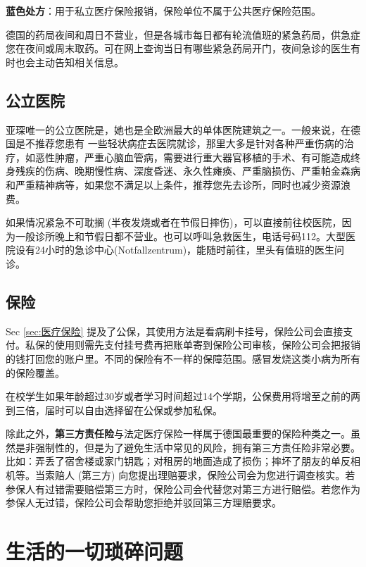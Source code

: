     \textbf{蓝色处方}：用于私立医疗保险报销，保险单位不属于公共医疗保险范围。

    德国的药局夜间和周日不营业，但是各城市每日都有轮流值班的紧急药局，供急症您在夜间或周末取药。可在网上查询当日有哪些紧急药局开门，夜间急诊的医生有时也会主动告知相关信息。

  \subsection{公立医院}\label{subsec:公立医院}

    亚琛唯一的公立医院是，她也是全欧洲最大的单体医院建筑之一。一般来说，在德国是不推荐您患有 一些轻状病症去医院就诊，那里大多是针对各种严重伤病的治疗，如恶性肿瘤，严重心脑血管病，需要进行重大器官移植的手术、有可能造成终身残疾的伤病、晚期慢性病、深度昏迷、永久性瘫痪、严重脑损伤、严重帕金森病和严重精神病等，如果您不满足以上条件，推荐您先去诊所，同时也减少资源浪费。

    如果情况紧急不可耽搁 (半夜发烧或者在节假日摔伤)，可以直接前往校医院，因为一般诊所晚上和节假日都不营业。也可以呼叫急救医生，电话号码112。大型医院设有24小时的急诊中心(Notfallzentrum)，能随时前往，里头有值班的医生问诊。

  \subsection{保险}\label{subsec:保险}

    Sec \ref{sec:医疗保险} 提及了公保，其使用方法是看病刷卡挂号，保险公司会直接支付。私保的使用则需先支付挂号费再把账单寄到保险公司审核，保险公司会把报销的钱打回您的账户里。不同的保险有不一样的保障范围。感冒发烧这类小病为所有的保险覆盖。

    在校学生如果年龄超过30岁或者学习时间超过14个学期，公保费用将增至之前的两到三倍，届时可以自由选择留在公保或参加私保。

    除此之外，\textbf{第三方责任险}与法定医疗保险一样属于德国最重要的保险种类之一。虽然是非强制性的，但是为了避免生活中常见的风险，拥有第三方责任险非常必要。比如：弄丢了宿舍楼或家门钥匙；对租房的地面造成了损伤；摔坏了朋友的单反相机等。当索赔人 (第三方) 向您提出理赔要求，保险公司会为您进行调查核实。若参保人有过错需要赔偿第三方时，保险公司会代替您对第三方进行赔偿。若您作为参保人无过错，保险公司会帮助您拒绝并驳回第三方理赔要求。

\section{生活的一切琐碎问题}\label{sec:生活的一切琐碎问题}

